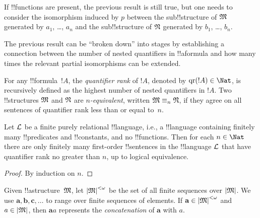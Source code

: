 \documentclass[../../../include/open-logic-section]{subfiles}
\begin{document}
\begin{rem}
If !!{function}s are present, the previous result is still true, but
one needs to consider the isomorphism induced by $p$ between the
sub!!{structure} of $\Struct{M}$ generated by $a_1$, \dots, $a_n$ and the
sub!!{structure} of $\Struct{N}$ generated by $b_1$, \dots, $b_n$.
\end{rem}

The previous result can be ``broken down'' into stages by establishing a
connection between the number of nested quantifiers in !!a{formula} and
how many times the relevant partial isomorphisms can be extended.

\begin{defn}
  For any !!{formula}~$!A$, the \emph{quantifier rank} of $!A$, denoted
  by $\QuantRank{!A} \in \Nat$, is recursively defined as
  the highest number of nested quantifiers in $!A$.  Two
  !!{structure}s $\Struct{M}$ and $\Struct{N}$ are \emph{$n$-equivalent},
  written $\Struct{M} \elemequiv[n] \Struct{N}$, if they agree on all
  sentences of quantifier rank less than or equal to~$n$.
\end{defn}

\begin{prop}
  Let $\Lang{L}$ be a finite purely relational !!{language}, i.e., a
  !!{language} containing finitely many !!{predicate}s and !!{constant}s,
  and no !!{function}s. Then for each $n \in \Nat$ there are
  only finitely many first-order !!{sentence}s in the !!{language}
  $\Lang{L}$ that have quantifier rank no greater than $n$, up to
  logical equivalence.
\end{prop}

\begin{proof}
  By induction on $n$.
\end{proof}

\begin{defn}
  Given !!a{structure}~$\Struct{M}$, let $\Domain M^{<\omega}$ be the set of
  all finite sequences over $\Domain{M}$. We use $\mathbf{a},
  \mathbf{b}, \mathbf{c}, \ldots$ to range over finite sequences of
  elements. If $\mathbf{a} \in \Domain{M}^{<\omega}$ and $a \in \Domain{M}$, then
  $\mathbf{a}a$ represents the \emph{concatenation} of $\mathbf{a}$ with $a$.
\end{defn}
\end{document}
